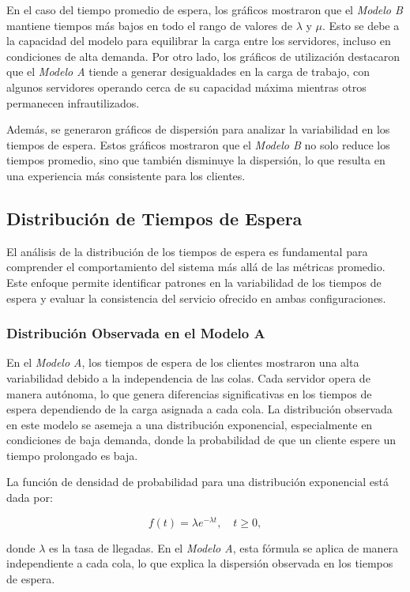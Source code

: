 \documentclass[a4paper,12pt]{article}
\begin{document}
En el caso del tiempo promedio de espera, los gráficos mostraron que el \textit{Modelo B} mantiene tiempos más bajos en todo el rango de valores de \( \lambda \) y \( \mu \). Esto se debe a la capacidad del modelo para equilibrar la carga entre los servidores, incluso en condiciones de alta demanda. Por otro lado, los gráficos de utilización destacaron que el \textit{Modelo A} tiende a generar desigualdades en la carga de trabajo, con algunos servidores operando cerca de su capacidad máxima mientras otros permanecen infrautilizados.

Además, se generaron gráficos de dispersión para analizar la variabilidad en los tiempos de espera. Estos gráficos mostraron que el \textit{Modelo B} no solo reduce los tiempos promedio, sino que también disminuye la dispersión, lo que resulta en una experiencia más consistente para los clientes.

\subsection{Distribución de Tiempos de Espera}

El análisis de la distribución de los tiempos de espera es fundamental para comprender el comportamiento del sistema más allá de las métricas promedio. Este enfoque permite identificar patrones en la variabilidad de los tiempos de espera y evaluar la consistencia del servicio ofrecido en ambas configuraciones.

\subsubsection{Distribución Observada en el Modelo A}

En el \textit{Modelo A}, los tiempos de espera de los clientes mostraron una alta variabilidad debido a la independencia de las colas. Cada servidor opera de manera autónoma, lo que genera diferencias significativas en los tiempos de espera dependiendo de la carga asignada a cada cola. La distribución observada en este modelo se asemeja a una distribución exponencial, especialmente en condiciones de baja demanda, donde la probabilidad de que un cliente espere un tiempo prolongado es baja.

La función de densidad de probabilidad para una distribución exponencial está dada por:

\[
f(t) = \lambda e^{-\lambda t}, \quad t \geq 0,
\]

donde \( \lambda \) es la tasa de llegadas. En el \textit{Modelo A}, esta fórmula se aplica de manera independiente a cada cola, lo que explica la dispersión observada en los tiempos de espera.
\end{document}
